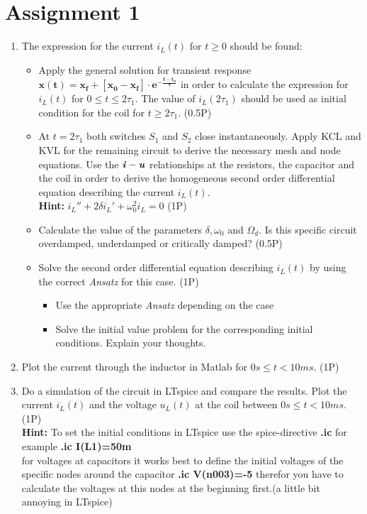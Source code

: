 \documentclass[a4paper]{article}
\begin{document}
	\section*{Assignment 1}
	\begin{enumerate}
		\item The  expression for the current $i_L(t)$ for $t\geq0$ should be found:
		\begin{itemize}
			\item Apply the general solution for transient response $\mathbf{x(t) = x_f + [x_0 - x_f ] \cdot e^{-\frac{t-t_0}{\tau}}}$ in order to calculate the expression for $i_L(t)$ for $0 \leq t \leq 2 \tau_1$. The value of $i_L(2 \tau_1)$ should be used as initial condition for the coil for $t \geq 2 \tau_1$. (0.5P)
						
			\item At $t = 2 \tau_1$ both switches $S_1$ and $S_2$ close instantaneously. Apply KCL and KVL for the remaining circuit to derive the necessary mesh and node equations. Use the $\textbf{\textit{i}}-\textbf{\textit{u}}$ relationships at the resistors, the capacitor and the coil in order to derive the homogeneous second order differential equation describing the current $i_L(t)$. \\\textbf{Hint:} $i_L'' + 2 \delta i_L' + \omega_0^2 i_L = 0$ (1P)
	
			\item Calculate the value of the parameters $\delta,\omega_0$ and $\Omega_d$. Is this specific circuit overdamped, underdamped or critically damped? (0.5P)
			
			\item  Solve the second order differential equation describing $i_L(t)$ by using the correct \textit{Ansatz} for this case. (1P)
			\begin{itemize}
				\item Use the appropriate \textit{Ansatz} depending on the case
				\item Solve the initial value problem for the corresponding initial conditions. Explain your thoughts.
			\end{itemize}				
		\end{itemize}
	
		\item Plot the current through the inductor in Matlab for $0s\leq t<10ms$. (1P)
		
		\item Do a simulation of the circuit in LTspice and compare the results. Plot the current $i_L(t)$ and the voltage $u_L(t)$ at the coil between $0s\leq t<10ms$. (1P)
		\\\textbf{Hint:} To set the initial conditions in LTspice use the spice-directive \textbf{.ic} for example \textbf{.ic I(L1)=50m} \\
		for voltages at capacitors it works best to define the initial voltages of the specific nodes around the capacitor \textbf{.ic V(n003)=-5} therefor you have to calculate the voltages at this nodes at the beginning first.(a little bit annoying in LTspice)
		
		
	\end{enumerate}
	
\end{document}
